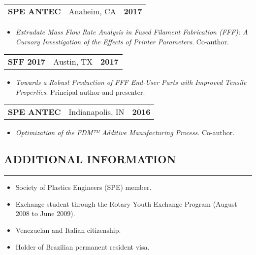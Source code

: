\documentclass[11pt,letterpaper]{article}
\makeatletter
\newcommand{\headerrow}[3]
{\vspace{0.4em}
\noindent
\begin{tabular*}{\textwidth}{l @{\extracolsep{\fill}} cr}
	\textbf{#1} & %
	#2 &		  %
	\textbf{#3}\\ %
\end{tabular*}}
\makeatother
\begin{document}
	\headerrow
		{SPE ANTEC}
		{Anaheim, CA}
		{2017}
	\begin{itemize}
		\item \emph{Extrudate Mass Flow Rate Analysis in Fused Filament Fabrication (FFF): A Cursory Investigation of the Effects of Printer Parameters}. Co-author.
	\end{itemize}
	
	\headerrow
		{SFF 2017}
		{Austin, TX}
		{2017}
	\begin{itemize}
		\item \emph{Towards a Robust Production of FFF End-User Parts with Improved Tensile Properties}. Principal author and presenter.
	\end{itemize}
	
	\headerrow
		{SPE ANTEC}
		{Indianapolis, IN}
		{2016}
	\begin{itemize}
		\item \emph{Optimization of the FDM™ Additive Manufacturing Process}. Co-author.
	\end{itemize}

\subsection*{ADDITIONAL INFORMATION}
	\vspace{-0.5em}
	\hrule
	\vspace{0.8em}
	\begin{itemize}
		\item Society of Plastics Engineers (SPE) member.
		\item Exchange student through the Rotary Youth Exchange Program (August 2008 to June 2009).
		\item Venezuelan and Italian citizenship.
		\item Holder of Brazilian permanent resident visa.
	\end{itemize}
	
	
	
\end{document}
